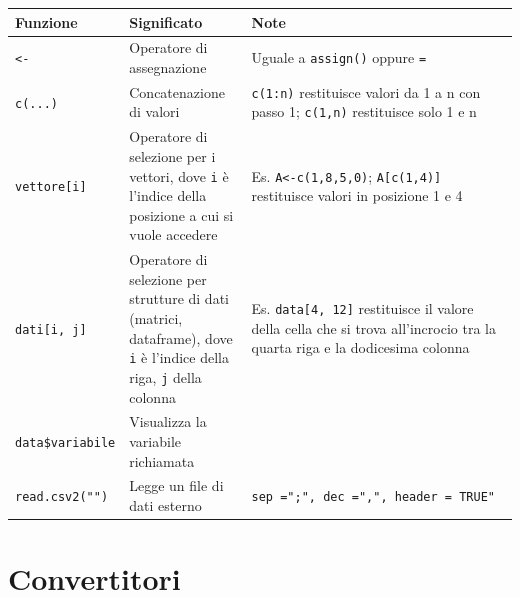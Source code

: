 \documentclass[
  a4paper,
  DIV=11,
  numbers=noendperiod]{scrreprt}
\begin{document}
\begin{longtable}[]{@{}
  >{\raggedright\arraybackslash}p{}
  >{\raggedright\arraybackslash}p{}
  >{\raggedright\arraybackslash}p{}@{}}
\toprule\noalign{}
\begin{minipage}[b]{\linewidth}\raggedright
Funzione
\end{minipage} & \begin{minipage}[b]{\linewidth}\raggedright
Significato
\end{minipage} & \begin{minipage}[b]{\linewidth}\raggedright
Note
\end{minipage} \\
\midrule\noalign{}
\endhead
\bottomrule\noalign{}
\endlastfoot
\texttt{\textless{}-} & Operatore di assegnazione & Uguale a
\texttt{assign()} oppure \texttt{=} \\
\texttt{c(...)} & Concatenazione di valori & \texttt{c(1:n)} restituisce
valori da 1 a n con passo 1; \texttt{c(1,n)} restituisce solo 1 e n \\
\texttt{vettore{[}i{]}} & Operatore di selezione per i vettori, dove
\texttt{i} è l'indice della posizione a cui si vuole accedere & Es.
\texttt{A\textless{}-c(1,8,5,0)}; \texttt{A{[}c(1,4){]}} restituisce
valori in posizione 1 e 4 \\
\texttt{dati{[}i,\ j{]}} & Operatore di selezione per strutture di dati
(matrici, dataframe), dove \texttt{i} è l'indice della riga, \texttt{j}
della colonna & Es. \texttt{data{[}4,\ 12{]}} restituisce il valore
della cella che si trova all'incrocio tra la quarta riga e la dodicesima
colonna \\
\texttt{data\$variabile} & Visualizza la variabile richiamata & \\
\texttt{read.csv2("")} & Legge un file di dati esterno &
\texttt{sep\ =";",\ dec\ =",",\ header\ =\ TRUE"} \\
\end{longtable}

\section{Convertitori}\label{convertitori}
\end{document}
